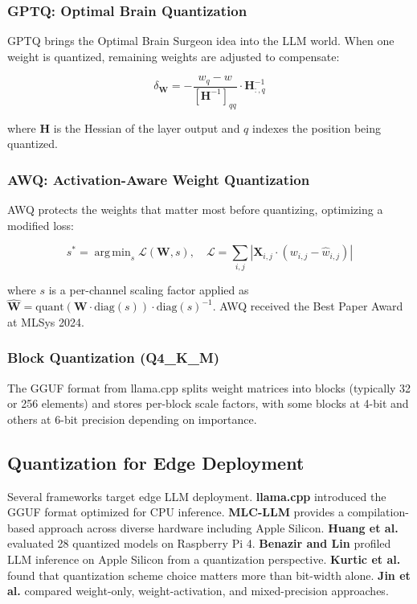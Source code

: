 \documentclass[journal]{IEEEtran}
\DeclareMathOperator*{\argmin}{arg\,min}
\begin{document}
\subsubsection{GPTQ: Optimal Brain Quantization}

GPTQ \cite{frantar2022gptq} brings the Optimal Brain Surgeon idea \cite{lecun1990optimal} into the LLM world. When one weight is quantized, remaining weights are adjusted to compensate:

\begin{equation}
\delta_{\mathbf{W}} = -\frac{w_q - w}{[\mathbf{H}^{-1}]_{qq}} \cdot \mathbf{H}^{-1}_{:,q}
\end{equation}

where $\mathbf{H}$ is the Hessian of the layer output and $q$ indexes the position being quantized.

\subsubsection{AWQ: Activation-Aware Weight Quantization}

AWQ \cite{lin2023awq} protects the weights that matter most before quantizing, optimizing a modified loss:

\begin{equation}
s^* = \argmin_{s} \mathcal{L}(\mathbf{W}, s), \quad \mathcal{L} = \sum_{i,j} \left| \mathbf{X}_{i,j} \cdot (w_{i,j} - \hat{w}_{i,j}) \right|
\end{equation}

where $s$ is a per-channel scaling factor applied as $\hat{\mathbf{W}} = \text{quant}(\mathbf{W} \cdot \text{diag}(s)) \cdot \text{diag}(s)^{-1}$. AWQ received the Best Paper Award at MLSys 2024.

\subsubsection{Block Quantization (Q4\_K\_M)}

The GGUF format from llama.cpp \cite{llamacpp2023} splits weight matrices into blocks (typically 32 or 256 elements) and stores per-block scale factors, with some blocks at 4-bit and others at 6-bit precision depending on importance.

\subsection{Quantization for Edge Deployment}

Several frameworks target edge LLM deployment. \textbf{llama.cpp} \cite{llamacpp2023} introduced the GGUF format optimized for CPU inference. \textbf{MLC-LLM} \cite{mlcllm2023} provides a compilation-based approach across diverse hardware including Apple Silicon. \textbf{Huang et al.} \cite{huang2025llms} evaluated 28 quantized models on Raspberry Pi 4. \textbf{Benazir and Lin} \cite{benazir2025profiling} profiled LLM inference on Apple Silicon from a quantization perspective. \textbf{Kurtic et al.} \cite{kurtic2024give} found that quantization scheme choice matters more than bit-width alone. \textbf{Jin et al.} \cite{jin2024comprehensive} compared weight-only, weight-activation, and mixed-precision approaches.
\end{document}
